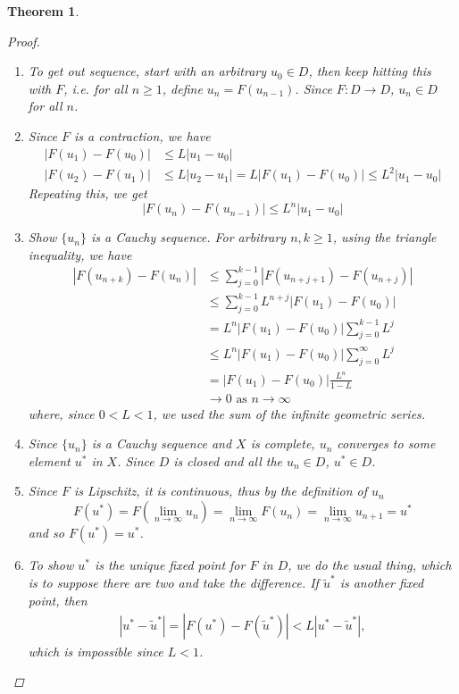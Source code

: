 \documentclass{article}
\newtheorem{theorem}{Theorem}[section]
\begin{document}
\begin{theorem}
\begin{proof}
\begin{enumerate}
	\item To get out sequence, start with an arbitrary $u_0 \in D$, then keep hitting this with $F$, i.e. for all $n \geq 1$, define $u_n = F(u_{n-1})$. Since $F: D \rightarrow D$, $u_n \in D$ for all $n$.
	\item Since $F$ is a contraction, we have
	\begin{align*}
	|F(u_1) - F(u_0)| &\leq L |u_1 - u_0| \\
	|F(u_2) - F(u_1)| &\leq L |u_2 - u_1| = L|F(u_1) - F(u_0)| \leq L^2 |u_1 - u_0|
	\end{align*}
	Repeating this, we get
	\[
	|F(u_{n}) - F(u_{n-1})| \leq L^n |u_1 - u_0|
	\]
	\item Show $\{ u_n \}$ is a Cauchy sequence. For arbitrary $n, k \geq 1$, using the triangle inequality, we have
	\begin{align*}
	|F(u_{n+k}) - F(u_n)| &\leq \sum_{j=0}^{k-1} |F(u_{n+j+1}) - F(u_{n+j})| \\
	&\leq \sum_{j=0}^{k-1} L^{n+j}|F(u_1) - F(u_0)| \\
	&= L^n |F(u_1) - F(u_0)| \sum_{j=0}^{k-1} L^j \\
	&\leq L^n |F(u_1) - F(u_0)| \sum_{j=0}^{\infty} L^j \\
	&= |F(u_1) - F(u_0)| \frac{L^n}{1 - L} \\
	&\rightarrow 0 \text{ as }n \rightarrow \infty
	\end{align*}
	where, since $0 < L < 1$, we used the sum of the infinite geometric series.
	\item Since $\{ u_n \}$ is a Cauchy sequence and $X$ is complete, $u_n$ converges to some element $u^*$ in $X$. Since $D$ is closed and all the $u_n \in D$, $u^* \in D$.
	\item Since $F$ is Lipschitz, it is continuous, thus by the definition of $u_n$
	\[
	F(u^*) = F(\lim_{n\rightarrow \infty} u_n) = \lim_{n \rightarrow \infty} F(u_n) 
	= \lim_{n \rightarrow \infty} u_{n+1} = u^*
	\]
	and so $F(u^*) = u^*$.
	\item To show $u^*$ is the unique fixed point for $F$ in $D$, we do the usual thing, which is to suppose there are two and take the difference. If $\tilde{u}^*$ is another fixed point, then
	\begin{align*}
	|u^* - \tilde{u}^*| = |F(u^*) - F(\tilde{u}^*)| < L|u^* - \tilde{u}^*|,
	\end{align*}
	which is impossible since $L < 1$.
\end{enumerate}
\end{proof}
\end{theorem}
\end{document}
